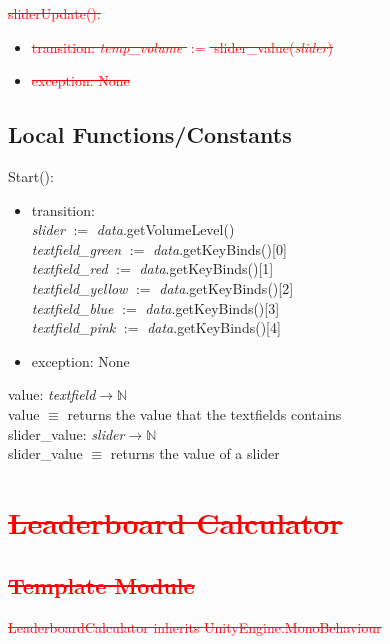 \documentclass[12pt]{article}
\begin{document}
\noindent \textcolor{red}{\sout{sliderUpdate():}}
\begin{itemize}
	\item \textcolor{red}{\sout{transition: \textit{temp\_volume} $:=$ slider\_value(\textit{slider})}}
	\item \textcolor{red}{\sout{exception: None}}
\end{itemize}

\subsection{Local Functions/Constants}

\noindent Start():
\begin{itemize}
	\item transition: \\
	\textit{slider} $:=$ \textit{data}.getVolumeLevel()\\
	\textit{textfield\_green} $:=$ \textit{data}.getKeyBinds()[0]\\
	\textit{textfield\_red} $:=$ \textit{data}.getKeyBinds()[1]\\
	\textit{textfield\_yellow} $:=$ \textit{data}.getKeyBinds()[2]\\
	\textit{textfield\_blue} $:=$ \textit{data}.getKeyBinds()[3]\\
	\textit{textfield\_pink} $:=$ \textit{data}.getKeyBinds()[4]
	\item exception: None
\end{itemize}

value: \textit{textfield}$\rightarrow \mathbb{N}$\\
value $\equiv$ returns the value that the textfields contains\\

\noindent slider\_value: \textit{slider}$\rightarrow \mathbb{N}$\\
slider\_value $\equiv$ returns the value of a slider

\newpage
\section{\textcolor{red}{\sout{Leaderboard Calculator}}}

\subsection{\textcolor{red}{\sout{Template Module}}}
\textcolor{red}{\sout{LeaderboardCalculator inherits UnityEngine.MonoBehaviour}}
\end{document}
